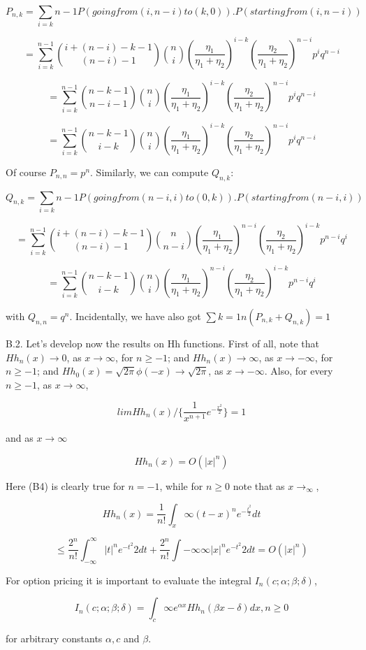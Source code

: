 $$P_{n,k}=\sum_{i=k}{n-1}P(going from (i,n-i) to (k,0)). P(starting from (i,n-i))$$

$$=\sum_{i=k}^{n-1}\binom {i+(n-i)-k-1} {(n-i)-1}\binom {n} {i}(\frac{\eta_{1}}{\eta_{1}+\eta_{2}})^{i-k}(\frac{\eta_{2}}{\eta_{1}+\eta_{2}})^{n-i}p^{i}q^{n-i}$$

$$=\sum_{i=k}^{n-1}\binom {n-k-1} {n-i-1}\binom {n} {i}(\frac{\eta_{1}}{\eta_{1}+\eta_{2}})^{i-k}(\frac{\eta_{2}}{\eta_{1}+\eta_{2}})^{n-i}p^{i}q^{n-i}$$

$$=\sum_{i=k}^{n-1}\binom {n-k-1} {i-k}\binom {n} {i}(\frac{\eta_{1}}{\eta_{1}+\eta_{2}})^{i-k}(\frac{\eta_{2}}{\eta_{1}+\eta_{2}})^{n-i}p^{i}q^{n-i}$$

Of course $P_{n,n}=p^{n}$. Similarly, we can compute $Q_{n,k}$:

$$Q_{n,k}=\sum_{i=k}{n-1}P(going from (n-i,i) to (0,k)). P(starting from (n-i,i))$$

$$=\sum_{i=k}^{n-1}\binom {i+(n-i)-k-1} {(n-i)-1}\binom {n} {n-i}(\frac{\eta_{1}}{\eta_{1}+\eta_{2}})^{n-i}(\frac{\eta_{2}}{\eta_{1}+\eta_{2}})^{i-k}p^{n-i}q^{i}$$

$$=\sum_{i=k}^{n-1}\binom {n-k-1} {i-k}\binom {n} {i}(\frac{\eta_{1}}{\eta_{1}+\eta_{2}})^{n-i}(\frac{\eta_{2}}{\eta_{1}+\eta_{2}})^{i-k}p^{n-i}q^{i}$$

with $Q_{n,n}=q^{n}$. Incidentally, we have also got $\sum{k=1}{n}(P_{n,k}+Q_{n,k})=1$

B.2. Let's develop now the results on Hh functions.
First of all, note that $Hh_{n}(x)\rightarrow 0$, as $x \rightarrow \infty$, for $n \geq -1$; and $Hh_{n}(x) \rightarrow \infty$, as $x \rightarrow -\infty$, for $n \geq -1$; and $Hh_{0}(x)=\sqrt{2\pi} \phi(-x) \rightarrow \sqrt{2\pi}$, as $x \rightarrow -\infty$. Also, for every $n \geq -1$, as $x \rightarrow \infty$,

$$lim Hh_{n}(x)/\{\frac{1}{x^{n+1}}e^{-\frac{x^{2}}{2}}\}=1$$

and as $x \rightarrow \infty$

$$Hh_{n}(x)=O(|x|^{n})$$

Here (B4) is clearly true for $n=-1$, while for $n \geq 0$ note that as $x\rightarrow _\infty$,

$$Hh_{n}(x)=\frac{1}{n!}\int_{x}{\infty}(t-x)^{n}e^{-\frac{t^{2}}{2}}dt$$

$$\leq \frac{2^{n}}{n!}\int_{-\infty}^{\infty}|t|^{n}e^{-t^{2}}{2}dt+\frac{2^{n}}{n!}\int{-\infty}{\infty}|x|^{n}e^{-t^{2}}{2}dt=O(|x|^{n})$$

For option pricing it is important to evaluate the integral $I_{n}(c;\alpha;\beta;\delta)$,

$$I_{n}(c;\alpha;\beta;\delta)=\int_{c}{\infty}e^{\alpha x}Hh_{n}(\beta x-\delta)dx, n\geq 0$$

for arbitrary constants $\alpha, c$ and $\beta$.
